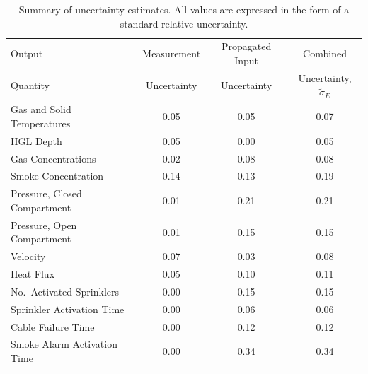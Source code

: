 \begin{table}[ht]
\caption[Summary of uncertainty estimates]{Summary of uncertainty estimates. All values are expressed in the form of a standard relative uncertainty.}
\begin{center}
\begin{tabular}{|l|c|c|c|}
\hline
Output                        & Measurement     & Propagated Input  & Combined                                  \\
Quantity                      & Uncertainty     & Uncertainty       & Uncertainty, $\widetilde{\sigma}_E$       \\ \hline \hline
Gas and Solid Temperatures    & 0.05            & 0.05              & 0.07                                      \\ \hline
HGL Depth                     & 0.05            & 0.00              & 0.05                                      \\ \hline
Gas Concentrations            & 0.02            & 0.08              & 0.08                                      \\ \hline
Smoke Concentration           & 0.14            & 0.13              & 0.19                                      \\ \hline
Pressure, Closed Compartment  & 0.01            & 0.21              & 0.21                                      \\ \hline
Pressure, Open Compartment    & 0.01            & 0.15              & 0.15                                      \\ \hline
Velocity                      & 0.07            & 0.03              & 0.08                                      \\ \hline
Heat Flux                     & 0.05            & 0.10              & 0.11                                      \\ \hline
No.~Activated Sprinklers      & 0.00            & 0.15              & 0.15                                      \\ \hline
Sprinkler Activation Time     & 0.00            & 0.06              & 0.06                                      \\ \hline
Cable Failure Time            & 0.00            & 0.12              & 0.12                                      \\ \hline
Smoke Alarm Activation Time   & 0.00            & 0.34              & 0.34                                      \\ \hline
\end{tabular}
\end{center}
\label{Uncertainty}
\end{table}



